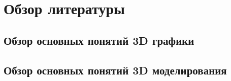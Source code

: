 \section{Обзор литературы}
\label{sec:domain}

\subsection{Обзор основных понятий 3D графики}
\label{sub:domain:overview_3d}


\subsection{Обзор основных понятий 3D моделирования}
\label{sub:domain:overview_3d_modelling}


